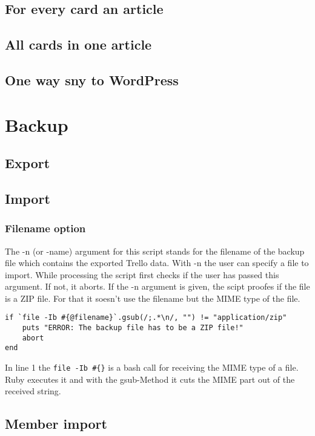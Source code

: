\subsection{For every card an article}

\subsection{All cards in one article}

\subsection{One way sny to WordPress}

\section{Backup}

\subsection{Export}

\subsection{Import}

\subsubsection{Filename option}
The -n (or -name) argument for this script stands for the filename of the backup file which contains the  exported Trello data. With -n the user can specify a file to import. While processing the script first checks if the user has passed this argument. If not, it aborts. If the -n argument is given, the scipt proofes if the file is a ZIP file. For that it soesn't use the filename but the MIME type of the file.

\begin{lstlisting}[float=htb, caption=Bewegungsdaten auslesen \cite{apple:003}, label=listing008]
if `file -Ib #{@filename}`.gsub(/;.*\n/, "") != "application/zip"
	puts "ERROR: The backup file has to be a ZIP file!"
	abort
end
\end{lstlisting}

	
In line 1 the \texttt{file -Ib \#\{\@filename\}} is a bash call for receiving the MIME type of a file. Ruby executes it and with the gsub-Method it cuts the MIME part out of the received string.

\subsection{Member import}

